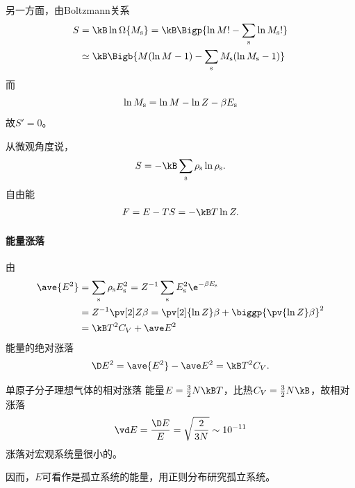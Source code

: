 另一方面，由Boltzmann关系
\begin{align*}
	S&=\kB\ln\Omega\{M_\st\}=\kB\Bigp{\ln M!-\sum_\st\ln M_\st!}\\
	&\simeq\kB\Bigb{M(\ln M-1)-\sum_\st M_\st(\ln M_\st-1)}
\end{align*}
而
\[
	\ln M_\mathrm s=\ln M-\ln Z-\beta E_\mathrm s
\]
故$S'=0$。

从微观角度说，
\begin{align}
	S=-\kB\sum_\st\rho_\st\ln\rho_\st.
\end{align}
自由能
\begin{align}
	F=E-TS=-\kB T\ln Z.
\end{align}
\paragraph{能量涨落}由
\begin{align*}
	\ave{E^2}&=\sum_\st\rho_\st E_\st^2=Z^{-1}\sum_\st E_\st^2\e^{-\beta E_\st}\\
	&=Z^{-1}\pv[2]Z\beta=\pv[2]{\ln Z}\beta+\biggp{\pv{\ln Z}\beta}^2\\
	&=\kB T^2C_V+\ave E^2
\end{align*}
能量的绝对涨落
\begin{align}
	\D E^2=\ave{E^2}-\ave E^2=\kB T^2C_V.
\end{align}
\begin{example}{单原子分子理想气体的相对涨落}{}
	能量$E=\frac32 N\kB T$，比热$C_V=\frac32N\kB$，故相对涨落
	\[
		\vd E=\frac{\D E}E=\sqrt{\frac2{3N}}\sim 10^{-11}
	\]
	涨落对宏观系统量很小的。
\end{example}
因而，$E$可看作是孤立系统的能量，用正则分布研究孤立系统。
